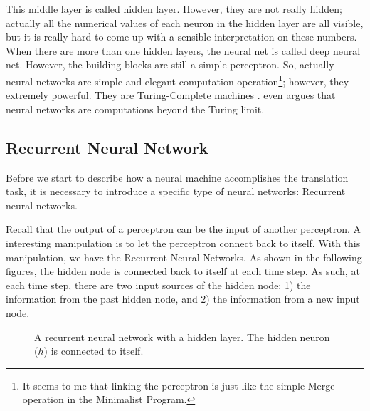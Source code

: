 \documentclass[final]{ua-thesis}
\numberwithin{equation}{section}
\begin{document}
This middle layer is called hidden layer. However, they are not really hidden; actually all the numerical values of each neuron in the hidden layer are all visible, but it is really hard to come up with a sensible interpretation on these numbers.  
When there are more than one hidden layers, the neural net is called deep neural net. However, the building blocks are still a simple perceptron. So, actually neural networks are simple and elegant computation operation\footnote{It seems to me that linking the perceptron is just like the simple Merge operation in the Minimalist Program.}; 
however, they extremely powerful. They are Turing-Complete machines \citep{siegelmann1991turing, graves2014neural}. \citet{siegelmann2003neural, siegelmann2012neural} even argues that neural networks are computations beyond the Turing limit. 

\subsection{Recurrent Neural Network}

Before we start to describe how a neural machine accomplishes the translation task, it is necessary to introduce a specific type of neural networks: Recurrent neural networks. 

Recall that the output of a perceptron can be the input of another perceptron. A interesting manipulation is to let the perceptron connect back to itself. With this manipulation, we have the Recurrent Neural Networks. As shown in the following figures, the hidden node is connected back to itself at each time step. As such, at each time step, there are two input sources of the hidden node: 1) the information from the past hidden node, and 2) the information from a new input node.       

\begin{figure}[h]
\caption{A recurrent neural network with a hidden layer. The hidden neuron ($h$) is connected to itself.}
\label{fig:rnn1}
\centering
{}
\end{figure}
\end{document}
